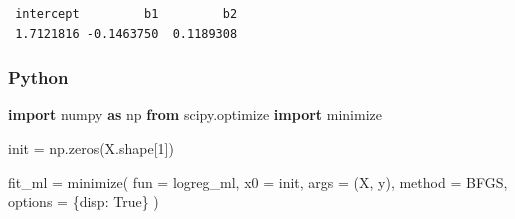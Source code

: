 \documentclass[
  letterpaper,
]{krantz}
\newenvironment{Shaded}{}{}
\newcommand{\AttributeTok}[1]{\textcolor[rgb]{0.49,0.56,0.16}{#1}}
\newcommand{\DecValTok}[1]{\textcolor[rgb]{0.25,0.63,0.44}{#1}}
\newcommand{\FloatTok}[1]{\textcolor[rgb]{0.25,0.63,0.44}{#1}}
\newcommand{\FunctionTok}[1]{\textcolor[rgb]{0.02,0.16,0.49}{#1}}
\newcommand{\ImportTok}[1]{\textcolor[rgb]{0.00,0.50,0.00}{\textbf{#1}}}
\newcommand{\NormalTok}[1]{#1}
\newcommand{\OperatorTok}[1]{\textcolor[rgb]{0.40,0.40,0.40}{#1}}
\newcommand{\OtherTok}[1]{\textcolor[rgb]{0.00,0.44,0.13}{#1}}
\newcommand{\SpecialCharTok}[1]{\textcolor[rgb]{0.25,0.44,0.63}{#1}}
\newcommand{\StringTok}[1]{\textcolor[rgb]{0.25,0.44,0.63}{#1}}
\newcommand{\VariableTok}[1]{\textcolor[rgb]{0.10,0.09,0.49}{#1}}
\begin{document}
\begin{Shaded}
\end{Shaded}

\begin{verbatim}
 intercept         b1         b2 
 1.7121816 -0.1463750  0.1189308 
\end{verbatim}

\subsubsection{Python}

\begin{Shaded}
\begin{Highlighting}[]
\ImportTok{import}\NormalTok{ numpy }\ImportTok{as}\NormalTok{ np}
\ImportTok{from}\NormalTok{ scipy.optimize }\ImportTok{import}\NormalTok{ minimize}

\NormalTok{init }\OperatorTok{=}\NormalTok{ np.zeros(X.shape[}\DecValTok{1}\NormalTok{])}

\NormalTok{fit\_ml }\OperatorTok{=}\NormalTok{ minimize(}
\NormalTok{    fun }\OperatorTok{=}\NormalTok{ logreg\_ml,}
\NormalTok{    x0 }\OperatorTok{=}\NormalTok{ init,}
\NormalTok{    args }\OperatorTok{=}\NormalTok{ (X, y),}
\NormalTok{    method }\OperatorTok{=} \StringTok{\textquotesingle{}BFGS\textquotesingle{}}\NormalTok{,}
\NormalTok{    options }\OperatorTok{=}\NormalTok{ \{}\StringTok{\textquotesingle{}disp\textquotesingle{}}\NormalTok{: }\VariableTok{True}\NormalTok{\}}
\NormalTok{)}
\end{Highlighting}
\end{Shaded}
\end{document}
